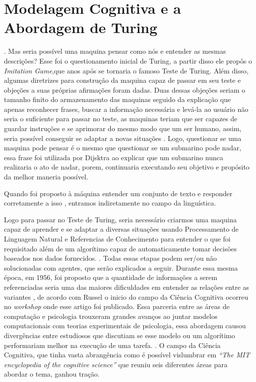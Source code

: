 
\section{Modelagem Cognitiva e a Abordagem de Turing}
. Mas seria possível uma maquina pensar como nós e entender as mesmas descrições? Esse foi o questionamento inicial de Turing, a partir disso ele propôs o \textit{Imitation Game},que anos após se tornaria o famoso Teste de Turing. Além disso, algumas diretrizes para construção da maquina capaz de passar em seu teste e objeções a suas próprias afirmações foram dadas. Duas dessas objeções seriam o tamanho finito do armazenamento das maquinas seguido da explicação que apenas reconhecer frases, buscar a informação necessária e levá-la ao usuário não seria o suficiente para passar no teste, as maquinas teriam que ser capazes de guardar instruções e se aprimorar do mesmo modo que um ser humano, assim, seria possível conseguir se adaptar a novas situações \cite[144-155]{turing1950}. Logo, questionar se uma maquina pode pensar é o mesmo que questionar se um submarino pode nadar, essa frase foi utilizada por Dijsktra \cite{dijkstra898} ao explicar que um submarino nunca realizaria o ato de nadar, porem, continuaria executando seu objetivo e propósito da melhor maneria possível.

Quando foi proposto à máquina entender um conjunto de texto e responder corretamente a isso \cite[146]{turing1950}, entramos indiretamente no campo da linguística.

Logo para passar no Teste de Turing, seria necessário criarmos uma maquina capaz de aprender e se adaptar a diversas situações usando Processamento de Linguagem Natural e Referencias de Conhecimento para entender o que foi requisitado além de um algorítimo capaz de automaticamente tomar decisões baseados nos dados fornecidos. \cite[2]{russell2003artificial}. Todas essas etapas podem ser/ou não solucionadas com agentes, que serão explicados a seguir. Durante essa mesma época, em 1956, foi proposto que a quantidade de informações a serem referenciadas seria uma das maiores dificuldades em entender as relações entre as variantes \cite[81-82]{miller1956magical}, de acordo com Russel \cite[13]{russell2003artificial} o inicio do campo da Ciência Cognitiva ocorreu no \textit{workshop} onde esse artigo foi publicado. Essa parceria entre as áreas de computação e psicologia trouxeram grandes avanços ao juntar modelos computacionais com teorias experimentais de psicologia, essa abordagem causou divergências entre estudiosos que discutiam se esse modelo ou um algorítimo performariam melhor na execução de uma tarefa. \cite[3]{russell2003artificial}. O campo da Ciência Cognitiva,  que tinha vasta abrangência como é possível vislumbrar em \textit{“The MIT encyclopedia of the cognitive science”} \cite{wilson2001encyclopedia} que reuniu seis diferentes áreas para abordar o tema, ganhou tração.

